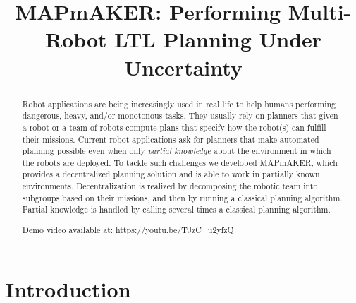 \documentclass[10pt,conference]{IEEEtran}
\newcommand\patrizio[1]{\nb{Patrizio}{#1}}
\newcommand\claudio[1]{\nb{Claudio}{#1}}
\newcommand{\ra}{$\rightarrow$}
\newcommand{\chg}[2]{\textcolor{red}{\sout{#1}}{\ra}\textcolor{blue}{\uline{#2}}} %
\newcommand{\toolName}{MAPmAKER}
\begin{document}
	
	
	\title{MAPmAKER: Performing Multi-Robot LTL Planning Under Uncertainty}

	
	\author{
	}	
	
	\maketitle

	\begin{abstract}
		Robot applications are being increasingly used in real life to help humans performing dangerous, heavy, and/or monotonous tasks.
		They usually rely on planners that given a robot or a team of robots compute plans that specify how the robot(s) can fulfill their missions.
		Current robot applications ask for planners that make automated planning 
		possible even when only \emph{partial knowledge} about the environment in which the robots are deployed.
		To tackle such challenges we developed \toolName, %
		which provides a decentralized planning solution  and  is able to work in partially known environments.
		Decentralization is realized by decomposing the robotic team into subgroups based on their missions, %
		and then by running a classical planning algorithm.
		Partial knowledge is handled by calling several times  a classical planning algorithm.
		
		Demo video available at: \url{https://youtu.be/TJzC_u2yfzQ}
	\end{abstract}
	
	\section{Introduction}
	
	
\end{document}
